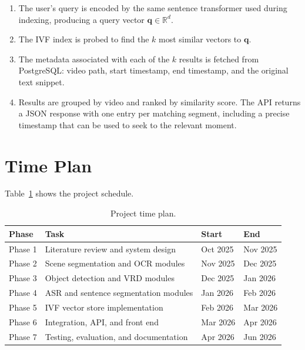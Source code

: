 \documentclass[12pt, a4paper]{report}
\begin{document}
\begin{enumerate}
  \item The user's query is encoded by the same sentence transformer used
    during indexing, producing a query vector $\mathbf{q} \in \mathbb{R}^d$.
  \item The IVF index is probed to find the $k$ most similar vectors to
    $\mathbf{q}$.
  \item The metadata associated with each of the $k$ results is fetched
    from PostgreSQL: video path, start timestamp, end timestamp, and the
    original text snippet.
  \item Results are grouped by video and ranked by similarity score.
    The API returns a JSON response with one entry per matching segment,
    including a precise timestamp that can be used to seek to the relevant
    moment.
\end{enumerate}

\section{Time Plan}

Table~\ref{tab:timeplan} shows the project schedule.

\begin{table}[H]
  \centering
  \caption{Project time plan.}
  \label{tab:timeplan}
  \begin{tabular}{llll}
    \toprule
    \textbf{Phase} & \textbf{Task} & \textbf{Start} & \textbf{End} \\
    \midrule
    Phase 1 & Literature review and system design      & Oct 2025 & Nov 2025 \\
    Phase 2 & Scene segmentation and OCR modules       & Nov 2025 & Dec 2025 \\
    Phase 3 & Object detection and VRD modules         & Dec 2025 & Jan 2026 \\
    Phase 4 & ASR and sentence segmentation modules    & Jan 2026 & Feb 2026 \\
    Phase 5 & IVF vector store implementation          & Feb 2026 & Mar 2026 \\
    Phase 6 & Integration, API, and front end          & Mar 2026 & Apr 2026 \\
    Phase 7 & Testing, evaluation, and documentation   & Apr 2026 & Jun 2026 \\
    \bottomrule
  \end{tabular}
\end{table}
\end{document}
